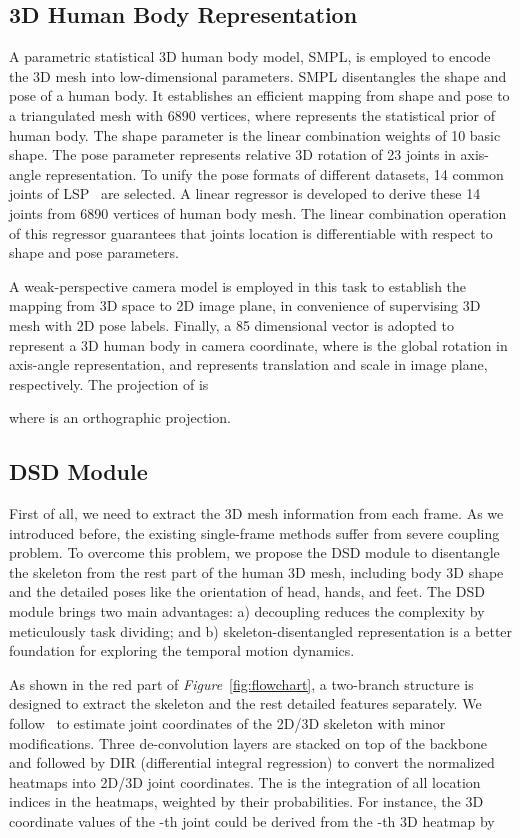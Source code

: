 \documentclass[10pt,twocolumn,letterpaper]{article}
\begin{document}
\subsection{3D Human Body Representation} \label{SMPL}

A parametric statistical 3D human body model, SMPL, is employed to encode the 3D mesh into low-dimensional parameters. SMPL disentangles the shape and pose of a human body. It establishes an efficient mapping  from shape  and pose  to a triangulated mesh with 6890 vertices, where  represents the statistical prior of human body. The shape parameter  is the linear combination weights of 10 basic shape. The pose parameter  represents relative 3D rotation of 23 joints in axis-angle representation. To unify the pose formats of different datasets, 14 common joints of LSP~\cite{lsp} are selected. A linear regressor  is developed to derive these 14 joints from 6890 vertices of human body mesh. The linear combination operation of this regressor guarantees that joints location is differentiable with respect to shape  and pose  parameters. 

A weak-perspective camera model is employed in this task to establish the mapping from 3D space to 2D image plane, in convenience of supervising 3D mesh with 2D pose labels. Finally, a 85 dimensional vector  is adopted to represent a 3D human body in camera coordinate, where  is the global rotation in axis-angle representation,  and  represents translation and scale in image plane, respectively. The projection of  is

where  is an orthographic projection.

\subsection{DSD Module\label{dsd}}
 First of all, we need to extract the 3D mesh information from each frame. As we introduced before, the existing single-frame methods suffer from severe coupling problem. To overcome this problem, we propose the DSD module to disentangle the skeleton from the rest part of the human 3D mesh, including body 3D shape and the detailed poses like the orientation of head, hands, and feet. The DSD module brings two main advantages: a) decoupling reduces the complexity by meticulously task dividing; and b) skeleton-disentangled representation is a better foundation for exploring the temporal motion dynamics. 


As shown in the red part of \textit{Figure}~\ref{fig:flowchart}, a two-branch structure is designed to extract the skeleton and the rest detailed features separately. We follow~\cite{integral} to estimate joint coordinates of the 2D/3D skeleton with minor modifications. Three de-convolution layers are stacked on top of the backbone and followed by DIR (differential integral regression) to convert the normalized heatmaps  into 2D/3D joint coordinates. The  is the integration of all location indices  in the heatmaps, weighted by their probabilities. For instance, the 3D coordinate values of the -th joint  could be derived from the -th 3D heatmap  by
\end{document}
